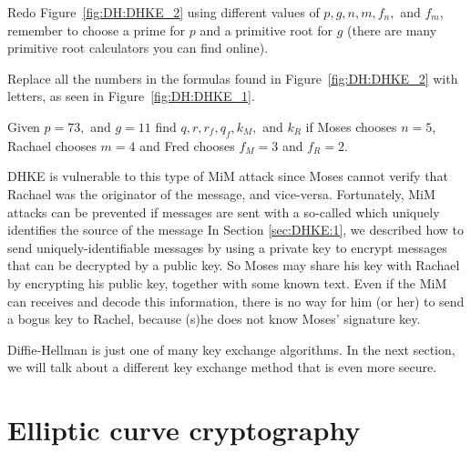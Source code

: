 \begin{exercise}\label{exercise:further_crypt:}
Redo Figure~\ref{fig:DH:DHKE_2} using different values of $p, g, n,m, f_n,$ and $f_m$, remember to choose a prime for $p$ and a primitive root for $g$ (there are many primitive root calculators you can find online).
\end{exercise}

\begin{exercise}\label{exercise:further_crypt:}
Replace all the numbers in the formulas found in Figure~\ref{fig:DH:DHKE_2} with letters, as seen in Figure~\ref{fig:DH:DHKE_1}.
\end{exercise}

\begin{exercise}\label{exercise:further_crypt:}
Given $p=73,$ and $g=11$ find $q, r, r_f, q_f, k_M,$ and $k_R$ if Moses chooses $n=5$, Rachael chooses $m=4$ and Fred chooses $f_M=3$ and $f_R=2$.
\end{exercise}

DHKE is vulnerable to this type of MiM attack since Moses cannot verify that Rachael was the originator of the message, and vice-versa.  Fortunately,  MiM attacks can be prevented if messages are sent with a so-called  which uniquely identifies the source of the message   In Section \ref{sec:DHKE:1}, we described how to send uniquely-identifiable messages by using a private key to encrypt  messages that can be decrypted by a public key.  So Moses may share his key with Rachael by encrypting his public key, together with some known text. Even if the MiM can receives and decode this information, there is no way for him (or her) to send a bogus key to Rachel, because (s)he does not know Moses' signature key.  

 Diffie-Hellman is just one of many key exchange algorithms. In the next section, we will talk about a different key exchange method that is even more secure.

\section{Elliptic curve cryptography}
\label{sec:ECC:2}

